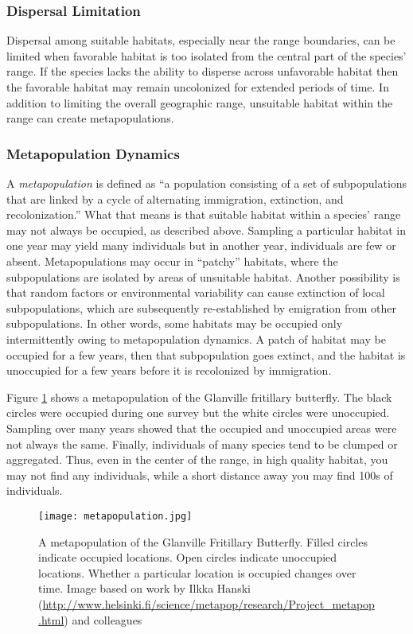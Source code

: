 \documentclass[11pt, hidelinks]{article}
\begin{document}
\subsubsection{Dispersal Limitation}

Dispersal among suitable habitats, especially near the range boundaries, can be limited when favorable habitat is too isolated from the central part of the species' range.  If the species lacks the ability to disperse across unfavorable habitat then the favorable habitat may remain uncolonized for extended periods of time.  In addition to limiting the overall geographic range, unsuitable habitat within the range can create metapopulations. 

\subsubsection{Metapopulation Dynamics}

A \emph{metapopulation} is defined as ``a population consisting of a set of subpopulations that are linked by a cycle of alternating immigration, extinction, and recolonization.''  What that means is that suitable habitat within a species' range may not always be occupied, as described above.  Sampling a particular habitat in one year may yield many individuals but in another year, individuals are few or absent.  Metapopulations may occur in ``patchy'' habitats, where the subpopulations are isolated by areas of unsuitable habitat.  Another possibility is that random factors or environmental variability can cause extinction of local subpopulations, which are subsequently re-established by emigration from other subpopulations. In other words, some habitats may be occupied only intermittently owing to metapopulation dynamics. A patch of habitat may be occupied for a few years, then that subpopulation goes extinct, and the habitat is unoccupied for a few years before it is recolonized by immigration. 

Figure \ref{metapop} shows a metapopulation of the Glanville fritillary butterfly.  The black circles were occupied during one survey but the white circles were unoccupied.  Sampling over many years showed that the occupied and unoccupied areas were not always the same.  Finally, individuals of many species tend to be clumped or aggregated.  Thus, even in the center of the range, in high quality habitat, you may not find any individuals, while a short distance away you may find 100s of individuals.

\begin{figure}[hb]
	\centering
	\texttt{[image: metapopulation.jpg]}
	\caption{A metapopulation of the Glanville Fritillary Butterfly. Filled circles indicate occupied locations. Open circles indicate unoccupied locations. Whether a particular location is occupied changes over time. Image based on work by Ilkka Hanski (\url{http://www.helsinki.fi/science/metapop/research/Project_metapop.html}) and colleagues \label{metapop}}
\end{figure}
\end{document}
